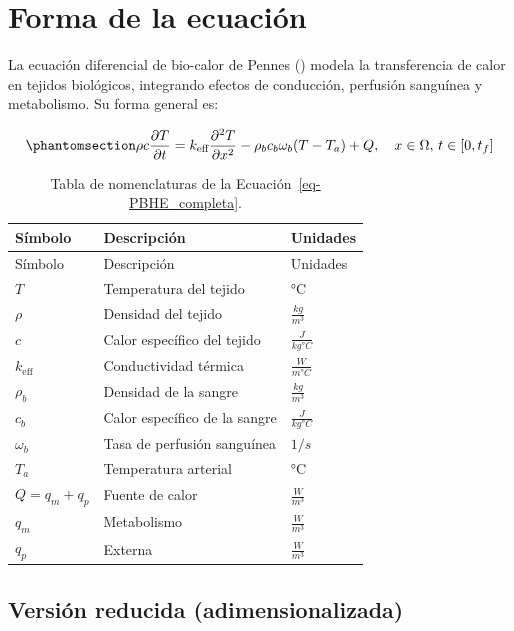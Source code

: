 \documentclass[
  spanish,
  us-letterpaper,
  DIV=11,
  numbers=noendperiod]{scrreprt}
\theoremstyle{definition}
\theoremstyle{plain}
\theoremstyle{remark}
\begin{document}
\chapter{Forma de la ecuación}\label{forma-de-la-ecuaciuxf3n}

La ecuación diferencial de bio-calor de Pennes
() modela la transferencia de calor en
tejidos biológicos, integrando efectos de conducción, perfusión
sanguínea y metabolismo. Su forma general es:

\begin{equation}\phantomsection\label{eq-PBHE_completa}{
\rho c \frac{\partial T}{\partial t} = k_{\text{eff}} \frac{\partial^{2} T}{\partial x^{2}} - \rho_b c_b \omega_b (T - T_a) + Q, \quad x \in \Omega, \, t \in [0, t_f]
}\end{equation}

\begin{longtable}[]{@{}lll@{}}
\caption{Tabla de nomenclaturas de la
Ecuación~\ref{eq-PBHE_completa}.}\label{tbl-nomenclatura-PBHE_completa}\tabularnewline
\toprule\noalign{}
Símbolo & Descripción & Unidades \\
\midrule\noalign{}
\endfirsthead
\toprule\noalign{}
Símbolo & Descripción & Unidades \\
\midrule\noalign{}
\endhead
\bottomrule\noalign{}
\endlastfoot
\(T\) & Temperatura del tejido & °C \\
\(\rho\) & Densidad del tejido & \(\frac{kg}{m^3}\) \\
\(c\) & Calor específico del tejido & \(\frac{J}{kg °C}\) \\
\(k_{\text{eff}}\) & Conductividad térmica & \(\frac{W}{m °C}\) \\
\(\rho_b\) & Densidad de la sangre & \(\frac{kg}{m^3}\) \\
\(c_b\) & Calor específico de la sangre & \(\frac{J}{kg °C}\) \\
\(\omega_b\) & Tasa de perfusión sanguínea & \(1/s\) \\
\(T_a\) & Temperatura arterial & °C \\
\(Q = q_m + q_p\) & Fuente de calor & \(\frac{W}{m^3}\) \\
\(q_m\) & Metabolismo & \(\frac{W}{m^3}\) \\
\(q_p\) & Externa & \(\frac{W}{m^3}\) \\
\end{longtable}

\section{Versión reducida
(adimensionalizada)}\label{versiuxf3n-reducida-adimensionalizada}
\end{document}
